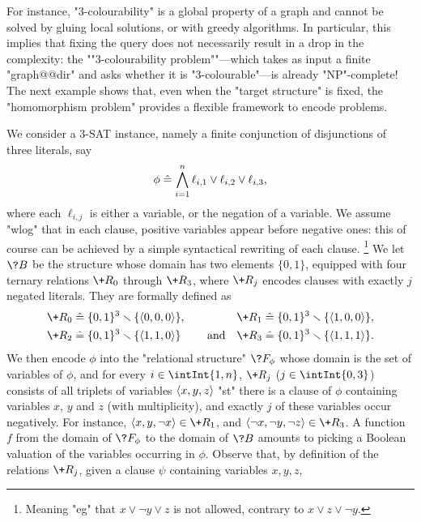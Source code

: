 For instance, "$3$-colourability" is a global property of a graph and cannot be solved
by gluing local solutions, or with greedy algorithms.
In particular, this implies that fixing the query
does not necessarily result in
a drop in the complexity: the \AP ""$3$-colourability problem""---which takes as input a finite "graph@@dir" and asks whether it is "$3$-colourable"---is already "NP"-complete!
The next example shows that, even when the "target structure" is fixed, the "homomorphism problem"
provides a flexible framework to encode problems.

\begin{example}
	\AP\label{ex:sat-as-hom}
	We consider a 3-SAT instance, namely a finite conjunction of
	disjunctions of three literals, say
	\[
		\phi \mathrel{\hat{=}} \bigwedge_{i=1}^n \ell_{i,1} \lor \ell_{i,2} \lor \ell_{i,3},
	\]
	where each $\ell_{i,j}$ is either a variable, or the negation of a variable.
	We assume "wlog" that in each clause, positive variables appear before negative ones:
	this of course can be achieved by a simple syntactical rewriting of each clause.%
	\footnote{Meaning "eg" that $x \lor \neg y \lor z$ is not allowed, contrary to
	$x \lor z \lor \neg y$.}
	We let $\?B$ be the structure whose domain has two elements $\{0,1\}$,
	equipped with four ternary relations $\+R_0$ through $\+R_3$, where $\+R_j$ encodes clauses with exactly $j$ negated literals. They are formally defined as
	\begin{align*}
		\+R_0 & \defeq \set{0,1}^3 \smallsetminus \set{\tup{0,0,0}}, &
		\+R_1 & \defeq \set{0,1}^3 \smallsetminus \set{\tup{1,0,0}}, \\
		\+R_2 & \defeq \set{0,1}^3 \smallsetminus \set{\tup{1,1,0}} \qquad\text{ and} &
		\+R_3 & \defeq \set{0,1}^3 \smallsetminus \set{\tup{1,1,1}}.
	\end{align*}
	We then encode $\phi$ into the "relational structure" $\?F_\phi$
	whose domain is the set of variables of $\phi$,
	and for every $i \in \intInt{1,n}$,
	$\+R_j$ ($j\in\intInt{0,3}$) consists of all triplets of variables $\langle x,y,z\rangle$
	"st" there is a clause of $\phi$ containing variables $x$, $y$ and $z$ (with multiplicity), and exactly $j$ of these variables occur negatively.
	For instance, $\tup{x, y, \neg x} \in \+R_1$, and $\tup{\neg x, \neg y, \neg z} \in \+R_3$.
	A function $f$ from the domain of $\?F_\phi$ to the domain of $\?B$ amounts to picking
	a Boolean valuation of the variables occurring in $\phi$.
	Observe that, by definition of the relations $\+R_j$,
	given a clause $\psi$ containing variables $x,y,z$, 

\end{example}
